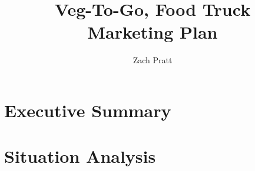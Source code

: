 \documentclass[12pt, letterpaper]{article}
\newcommand{\companyname}{Veg-To-Go}
\begin{document}
\linespread{1}

\title{\companyname,\textsuperscript{\textregistered} Food Truck\\ Marketing Plan}
\author{Zach Pratt}
\maketitle

\newpage

\renewcommand\contentsname{Table of Contents}
\renewcommand{\cftsecleader}{\cftdotfill{\cftdotsep}}
\tableofcontents

\newpage

\section{Executive Summary}
\section{Situation Analysis}
\end{document}
